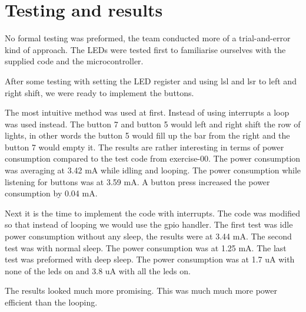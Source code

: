 \section{Testing and results}
No formal testing was preformed, the team conducted more of a trial-and-error kind of approach.
The LEDs were tested first to familiarise ourselves with the supplied code and the microcontroller.

After some testing with setting the LED register and using lsl and lsr to left and right shift, we were ready to implement the buttons.

The most intuitive method was used at first.
Instead of using interrupts a loop was used instead.
The button 7 and button 5 would left and right shift the row of lights, in other words the button 5 would fill up the bar from the right and the button 7 would empty it.
The results are rather interesting in terms of power consumption compared to the test code from exercise-00.
The power consumption was averaging at 3.42 mA while idling and looping. 
The power consumption while listening for buttons was at 3.59 mA.
A button press increased the power consumption by 0.04 mA.

Next it is the time to implement the code with interrupts.
The code was modified so that instead of looping we would use the gpio handler.
The first test was idle power consumption without any sleep, the results were at 3.44 mA.
The second test was with normal sleep.
The power consumption was at 1.25 mA.
The last test was preformed with deep sleep.
The power consumption was at 1.7 uA with none of the leds on and 3.8 uA with all the leds on.

The results looked much more promising.
This was much much more power efficient than the looping.
